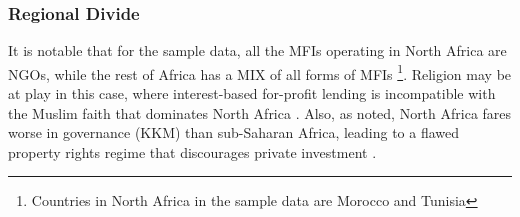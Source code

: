 \documentclass[a4paper,nobind]{templates/ociamthesis}
\begin{document}
\hypertarget{regional-divide}{%
\subsubsection{Regional Divide}\label{regional-divide}}

It is notable that for the sample data, all the MFIs operating in North Africa are NGOs, while the rest of Africa has a MIX of all forms of MFIs \footnote{Countries in North Africa in the sample data are Morocco and Tunisia}. Religion may be at play in this case, where interest-based for-profit lending is incompatible with the Muslim faith that dominates North Africa \autocite{hassan2018religious}. Also, as noted, North Africa fares worse in governance (KKM) than sub-Saharan Africa, leading to a flawed property rights regime that discourages private investment \autocite{johnson2002property,claessens2003financial}.

\newpage
\end{document}
